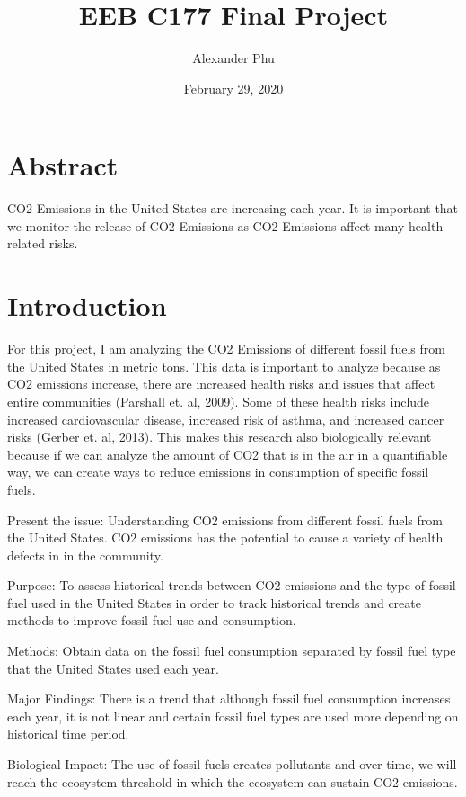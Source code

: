 \documentclass[letterpaper]{article}
\title{EEB C177 Final Project}
\author{Alexander Phu}
\date{February 29, 2020}
\begin{document}
\maketitle {}
\section*{Abstract}
CO2 Emissions in the United States are increasing each year. It is important that we monitor the release of CO2 Emissions as CO2 Emissions affect many health related risks. 

\newpage
\tableofcontents
\listoffigures

\newpage
\section{Introduction}

For this project, I am analyzing the CO2 Emissions of different fossil fuels from the United States in metric tons. This data is important to analyze because as CO2 emissions increase, there are increased health risks and issues that affect entire communities (Parshall et. al, 2009). Some of these health risks include increased cardiovascular disease, increased risk of asthma, and increased cancer risks (Gerber et. al, 2013). This makes this research also biologically relevant because if we can analyze the amount of CO2 that is in the air in a quantifiable way, we can create ways to reduce emissions in consumption of specific fossil fuels. 

Present the issue: 
	Understanding CO2 emissions from different fossil fuels from the United States. CO2 emissions has the potential to cause a variety of health defects in in the community. 

Purpose: 
	To assess historical trends between CO2 emissions and the type of fossil fuel used in the United States in order to track historical trends and create methods to improve fossil fuel use and consumption.
	
Methods:
	Obtain data on the fossil fuel consumption separated by fossil fuel type that the United States used each year. 
	
Major Findings:
	There is a trend that although fossil fuel consumption increases each year, it is not linear and certain fossil fuel types are used more depending on historical time period. 

Biological Impact:
	The use of fossil fuels creates pollutants and over time, we will reach the ecosystem threshold in which the ecosystem can sustain CO2 emissions.
\end{document}

